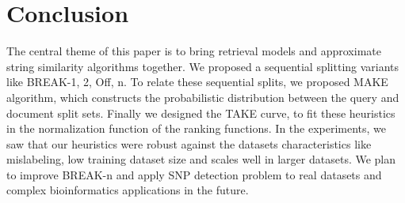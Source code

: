 \chapter{Conclusion} %
%
\label{ch:conclusion}

The central theme of this paper is to bring retrieval models and approximate string similarity algorithms together.
We proposed a sequential splitting variants like BREAK-1, 2, Off, n.
To relate these sequential splits, we proposed MAKE algorithm, which constructs the probabilistic distribution between the query and document split sets. 
Finally we designed the TAKE curve, to fit these heuristics in the normalization function of the ranking functions.
In the experiments, we saw that our heuristics were robust against the datasets characteristics like mislabeling, low training dataset size and scales well in larger datasets.
We plan to improve BREAK-n and apply SNP detection problem to real datasets and complex bioinformatics applications in the future.